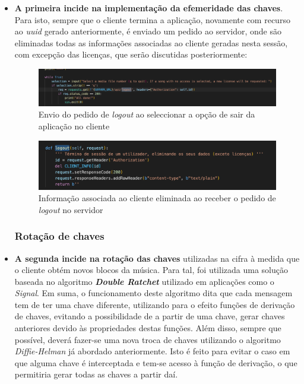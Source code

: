 \documentclass[10pt,english]{article}
\begin{document}
\begin{itemize}
    
\item  \textbf{A primeira incide na implementação da efemeridade das chaves}. Para isto, sempre que o cliente termina a aplicação, novamente com recurso ao \textit{uuid} gerado anteriormente, é enviado um pedido ao servidor, onde são eliminadas todas as informações associadas ao cliente geradas nesta sessão, com excepção das licenças, que serão discutidas posteriormente:

\begin{figure}[!h]
        \centering
        \includegraphics[width=\textwidth]{images/logout_client.png}
        \caption{Envio do pedido de \textit{logout} ao seleccionar a opção de sair da aplicação no cliente}
\end{figure}

\begin{figure}[!h]
        \centering
        \includegraphics[width=\textwidth]{images/logout_server.png}
        \caption{Informação associada ao cliente eliminada ao receber o pedido de \textit{logout} no servidor}
\end{figure}

\subsubsection{Rotação de chaves}

\item \textbf{A segunda incide na rotação das chaves} utilizadas na cifra à medida que o cliente obtém novos blocos da música. Para tal, foi utilizada uma solução baseada no algoritmo \textbf{\textit{Double Ratchet}} utilizado em aplicações como o \textit{Signal}. Em suma, o funcionamento deste algoritmo dita que cada mensagem tem de ter uma chave diferente, utilizando para o efeito funções de derivação de chaves, evitando a possibilidade de a partir de uma chave, gerar chaves anteriores devido às propriedades destas funções. Além disso, sempre que possível, deverá fazer-se uma nova troca de chaves utilizando o algoritmo \textit{Diffie-Helman} já abordado anteriormente. Isto é feito para evitar o caso em que alguma chave é interceptada e tem-se acesso à função de derivação, o que permitiria gerar todas as chaves a partir daí.


\end{itemize}
\end{document}

